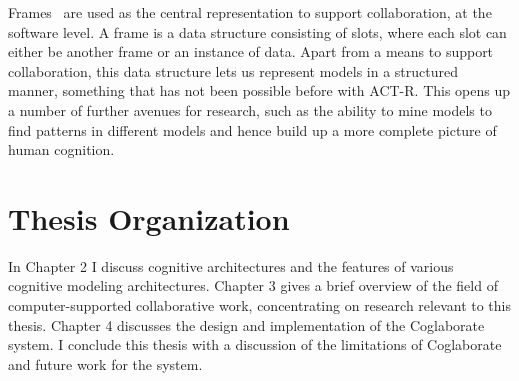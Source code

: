 Frames~\cite{Minsky1974a} are used as the central representation to
support collaboration, at the software level.  A frame is a data
structure consisting of slots, where each slot can either be another
frame or an instance of data. Apart from a means to support
collaboration, this data structure lets us represent models in a
structured manner, something that has not been possible before with
ACT-R.  This opens up a number of further avenues for research, such
as the ability to mine models to find patterns in different models and
hence build up a more complete picture of human cognition.



\section{Thesis Organization}
In Chapter 2 I discuss cognitive architectures and the features of
various cognitive modeling architectures. Chapter 3 gives a brief
overview of the field of computer-supported collaborative work,
concentrating on research relevant to this thesis. Chapter 4 discusses
the design and implementation of the Coglaborate system.  I conclude this thesis
with a discussion of the limitations of Coglaborate and future work
for the system.


